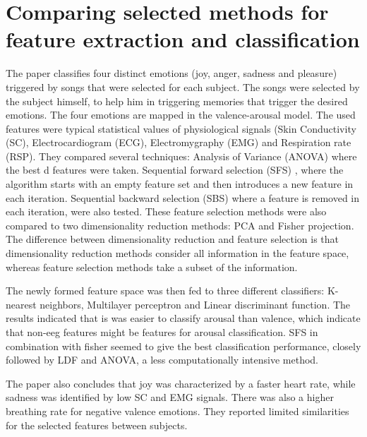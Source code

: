 \section{Comparing selected methods for feature extraction and classification}

The paper\citep{PhytoEm} classifies four distinct emotions (joy, anger, sadness and pleasure) triggered by songs that were selected for each subject. The songs were selected by the subject himself, to help him in triggering memories that trigger the desired emotions. The four emotions are mapped in the valence-arousal model. The used features were typical statistical values of physiological signals (Skin Conductivity (SC), Electrocardiogram (ECG), Electromygraphy (EMG) and Respiration rate (RSP). They compared several techniques: Analysis of Variance (ANOVA)  where the best d features were taken. Sequential forward selection (SFS) , where the algorithm starts with an empty feature set and then introduces a new feature in each iteration. Sequential backward selection (SBS)  where a feature is removed in each iteration, were also tested. These feature selection methods were also compared to two dimensionality reduction methods: PCA and Fisher projection. The difference between dimensionality reduction and feature selection is that dimensionality reduction methods consider all information in the feature space, whereas feature selection methods take a subset of the information.

\npar

The newly formed feature space was then fed to three different classifiers: K-nearest neighbors, Multilayer perceptron and Linear discriminant function. The results indicated that is was easier to classify arousal than valence, which indicate that non-eeg features might be features for arousal classification. SFS in combination with fisher seemed to give the best classification performance, closely followed by LDF and ANOVA, a less computationally intensive method.

\npar

The paper also concludes that joy was characterized by a faster heart rate, while sadness was identified by low SC and EMG signals. There was also a higher breathing rate for negative valence emotions. They reported limited similarities for the selected features between subjects.

